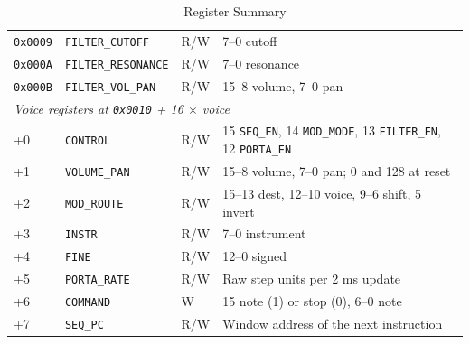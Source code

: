 \begin{table}[H]
\begin{tabular}{lllp{6.2cm}}
		\texttt{0x0009} & \texttt{FILTER\_CUTOFF}    & R/W             & 7--0 cutoff                                                                               \\
		\texttt{0x000A} & \texttt{FILTER\_RESONANCE} & R/W             & 7--0 resonance                                                                            \\
		\texttt{0x000B} & \texttt{FILTER\_VOL\_PAN}  & R/W             & 15--8 volume, 7--0 pan                                                                    \\
		\midrule
		\multicolumn{4}{l}{\textit{Voice registers at \texttt{0x0010} + 16 $\times$ voice}}                                                                        \\
		\midrule
		+0              & \texttt{CONTROL}           & R/W             & 15 \texttt{SEQ\_EN}, 14 \texttt{MOD\_MODE}, 13 \texttt{FILTER\_EN}, 12 \texttt{PORTA\_EN} \\
		+1              & \texttt{VOLUME\_PAN}       & R/W             & 15--8 volume, 7--0 pan; 0 and 128 at reset                                                \\
		+2              & \texttt{MOD\_ROUTE}        & R/W             & 15--13 dest, 12--10 voice, 9--6 shift, 5 invert                                           \\
		+3              & \texttt{INSTR}             & R/W             & 7--0 instrument                                                                           \\
		+4              & \texttt{FINE}              & R/W             & 12--0 signed                                                                              \\
		+5              & \texttt{PORTA\_RATE}       & R/W             & Raw step units per 2 ms update                                                            \\
		+6              & \texttt{COMMAND}           & W               & 15 note (1) or stop (0), 6--0 note                                                        \\
		+7              & \texttt{SEQ\_PC}           & R/W             & Window address of the next instruction                                                    \\
		\bottomrule
	\end{tabular}
	\caption{Register Summary}
	\label{tab:qr-registers}
\end{table}


